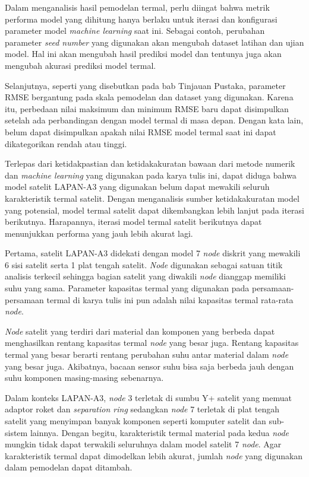 Dalam menganalisis hasil pemodelan termal, perlu diingat bahwa metrik performa
model yang dihitung hanya berlaku untuk iterasi dan konfigurasi parameter model
\textit{machine learning} saat ini. Sebagai contoh, perubahan parameter
\textit{seed number} yang digunakan akan mengubah dataset latihan dan ujian
model. Hal ini akan mengubah hasil prediksi model dan tentunya juga akan mengubah
akurasi prediksi model termal. 

Selanjutnya, seperti yang disebutkan pada bab Tinjauan Pustaka, parameter RMSE
bergantung pada skala pemodelan dan dataset yang digunakan. Karena itu,
perbedaan nilai maksimum dan minimum RMSE baru dapat disimpulkan setelah ada
perbandingan dengan model termal di masa depan. Dengan kata lain, belum dapat
disimpulkan apakah nilai RMSE model termal saat ini dapat dikategorikan rendah
atau tinggi.

Terlepas dari ketidakpastian dan ketidakakuratan bawaan dari metode numerik dan
\textit{machine learning} yang digunakan pada karya tulis ini, dapat diduga
bahwa model satelit LAPAN-A3 yang digunakan belum dapat mewakili seluruh
karakteristik termal satelit. Dengan menganalisis sumber ketidakakuratan model
yang potensial, model termal satelit dapat dikembangkan lebih lanjut pada
iterasi berikutnya. Harapannya, iterasi model termal satelit berikutnya dapat
menunjukkan performa yang jauh lebih akurat lagi.

Pertama, satelit LAPAN-A3 didekati dengan model 7 \textit{node} diskrit yang
mewakili 6 sisi satelit serta 1 plat tengah satelit. \textit{Node} digunakan sebagai
satuan titik analisis terkecil sehingga bagian satelit yang diwakili \textit{node}
dianggap memiliki suhu yang sama. Parameter kapasitas termal yang digunakan
pada persamaan-persamaan termal di karya tulis ini pun adalah nilai kapasitas
termal rata-rata \textit{node}. 

\textit{Node} satelit yang terdiri dari material dan komponen yang berbeda dapat
menghasilkan rentang kapasitas termal \textit{node} yang besar juga. Rentang kapasitas
termal yang besar berarti rentang perubahan suhu antar material dalam \textit{node} yang
besar juga. Akibatnya, bacaan sensor suhu bisa saja berbeda jauh dengan suhu
komponen masing-masing sebenarnya.

Dalam konteks LAPAN-A3, \textit{node} 3 terletak di sumbu Y+ satelit yang memuat adaptor
roket dan \textit{separation ring} sedangkan \textit{node} 7 terletak di plat tengah
satelit yang menyimpan banyak komponen seperti komputer satelit dan sub-sistem
lainnya. Dengan begitu, karakteristik termal material pada kedua \textit{node} mungkin
tidak dapat terwakili seluruhnya dalam model satelit 7 \textit{node}. Agar karakteristik
termal dapat dimodelkan lebih akurat, jumlah \textit{node} yang digunakan dalam
pemodelan dapat ditambah.

